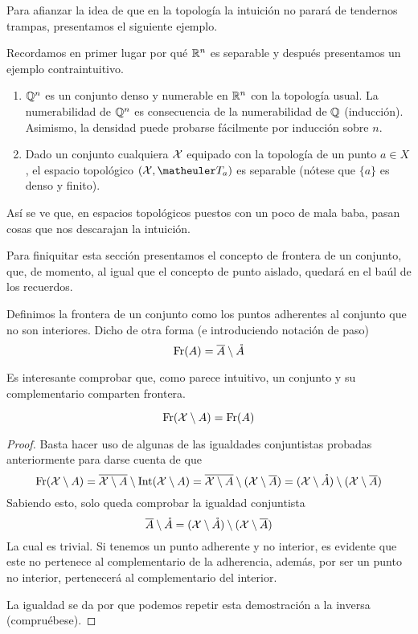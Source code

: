 Para afianzar la idea de que en la topología la intuición no parará de tendernos trampas, presentamos el siguiente ejemplo.
\begin{exa}
	Recordamos en primer lugar por qué $\mathbb{R}^n$ es separable y después presentamos un ejemplo contraintuitivo.
	\begin{enumerate}
		\item $\mathbb{Q}^n$ es un conjunto denso y numerable en $\mathbb{R}^n$ con la topología usual. La numerabilidad de $\mathbb{Q}^n$ es consecuencia de la numerabilidad de $\mathbb{Q}$ (inducción). Asimismo, la densidad puede probarse fácilmente por inducción sobre $n$.
		\item Dado un conjunto cualquiera $\mathcal{X}$ equipado con la topología de un punto $a\in X$, el espacio topológico $(\X,\T_a)$ es separable (nótese que $\{a\}$ es denso y finito).
	\end{enumerate}
	Así se ve que, en espacios topológicos puestos con un poco de mala baba, pasan cosas que nos descarajan la intuición.
\end{exa}
Para finiquitar esta sección presentamos el concepto de frontera de un conjunto, que, de momento, al igual que el concepto de punto aislado, quedará en el baúl de los recuerdos.
\begin{defi}
	Definimos la frontera de un conjunto como los puntos adherentes al conjunto que no son interiores. Dicho de otra forma (e introduciendo notación de paso)
	\begin{equation}
	\operatorname{\mathrm{Fr}}(A)=\overline{A}\setminus\mathring{A}
	\end{equation}
\end{defi}
Es interesante comprobar que, como parece intuitivo, un conjunto y su complementario comparten frontera.
\begin{lem}
	\begin{equation*}
		\operatorname{\mathrm{Fr}}(\mathcal{X} \setminus A)=\operatorname{\mathrm{Fr}}(A)
	\end{equation*}
\end{lem}
\begin{proof}
	Basta hacer uso de algunas de las igualdades conjuntistas probadas anteriormente para darse cuenta de que
	\begin{equation*}
		\operatorname{\mathrm{Fr}}(\mathcal{X} \setminus A)=\overline{\mathcal{X} \setminus A}\setminus \operatorname{\mathrm{Int}}(\mathcal{X} \setminus A)=\overline{\mathcal{X} \setminus A}\setminus (\mathcal{X}\setminus \overline{A})=(\mathcal{X}\setminus\mathring{A})\setminus (\mathcal{X}\setminus \overline{A})
	\end{equation*}
	Sabiendo esto, solo queda comprobar la igualdad conjuntista
	\begin{equation*}
		\overline{A}\setminus\mathring{A}=(\mathcal{X}\setminus\mathring{A})\setminus (\mathcal{X}\setminus \overline{A})
	\end{equation*}
	La cual es trivial. Si tenemos un punto adherente y no interior, es evidente que este no pertenece al complementario de la adherencia, además, por ser un punto no interior, pertenecerá al complementario del interior.
	
	La igualdad se da por que podemos repetir esta demostración a la inversa (compruébese). 
\end{proof}

